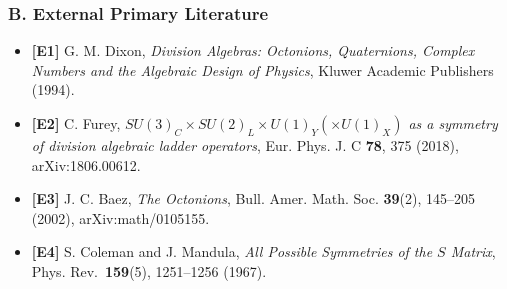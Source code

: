 \documentclass[
  a4paper,
]{article}
\providecommand{\tightlist}{%
  \setlength{\itemsep}{0pt}\setlength{\parskip}{0pt}}
\begin{document}
\subsubsection{B. External Primary
Literature}\label{b.-external-primary-literature}

\begin{itemize}
\tightlist
\item
  \textbf{{[}E1{]}} G. M. Dixon, \emph{Division Algebras: Octonions,
  Quaternions, Complex Numbers and the Algebraic Design of Physics},
  Kluwer Academic Publishers (1994).
\item
  \textbf{{[}E2{]}} C. Furey,
  \emph{\(SU(3)_C \times SU(2)_L \times U(1)_Y (\times U(1)_X)\) as a
  symmetry of division algebraic ladder operators}, Eur. Phys. J. C
  \textbf{78}, 375 (2018), arXiv:1806.00612.
\item
  \textbf{{[}E3{]}} J. C. Baez, \emph{The Octonions}, Bull. Amer. Math.
  Soc. \textbf{39}(2), 145--205 (2002), arXiv:math/0105155.
\item
  \textbf{{[}E4{]}} S. Coleman and J. Mandula, \emph{All Possible
  Symmetries of the \(S\) Matrix}, Phys. Rev.~\textbf{159}(5),
  1251--1256 (1967).
\end{itemize}
\end{document}
